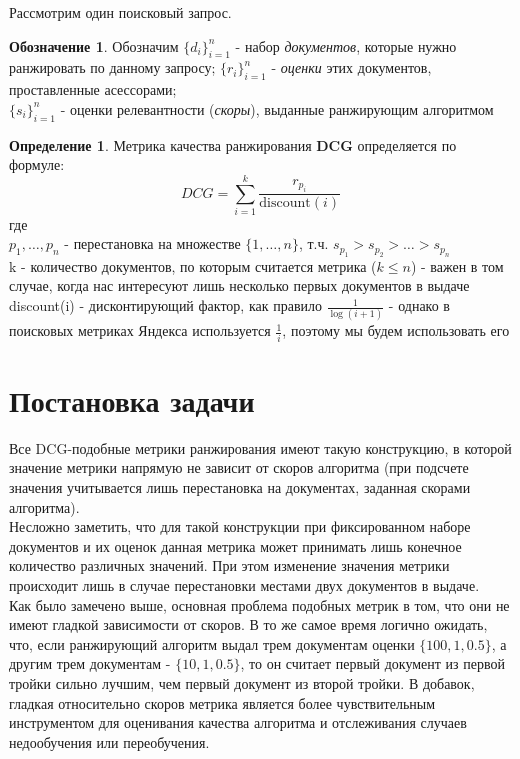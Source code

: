 \documentclass[14pt,a4paper]{amsart}
\theoremstyle{definition}
\newtheorem{definition}{Определение}[section]
\theoremstyle{definition}
\newtheorem{designation}{Обозначение}[section]
\newcommand{\Sum}{\sum\limits}
\renewcommand\i{\textit}
\renewcommand\t{\text}
\renewcommand\b{\textbf}
\begin{document}
Рассмотрим один поисковый запрос.

\begin{designation}
Обозначим $\{d_i\}_{i=1}^n$ - набор \i{документов}, которые нужно ранжировать по данному запросу; 
$\{r_i\}_{i=1}^n$ - \i{оценки} этих документов, проставленные асессорами; \\
$\{s_i\}_{i=1}^n$ - оценки релевантности (\i{скоры}), выданные ранжирующим алгоритмом
\end{designation}

\begin{definition}
Метрика качества ранжирования \b{DCG} определяется по формуле:
$$DCG = \Sum_{i=1}^k \frac{r_{p_i}}{\t{discount}(i)}$$
где \\
$p_1,\dots,p_n$ - перестановка на множестве $\{1,\dots,n\}$, т.ч. ${s_{p_1} > s_{p_2} > \dots > s_{p_n}}$ \\
k - количество документов, по которым считается метрика ($k \le n$) - важен в том случае, когда нас интересуют лишь несколько первых документов в выдаче \\
discount(i) - дисконтирующий фактор, как правило $\frac{1}{\log(i + 1)}$ - однако в поисковых метриках Яндекса используется $\frac{1}{i}$, поэтому мы будем использовать его \\
\end{definition}

\newpage
\section{Постановка задачи}

Все DCG-подобные метрики ранжирования имеют такую конструкцию, в которой значение метрики напрямую не зависит от скоров алгоритма (при подсчете значения учитывается лишь перестановка на документах, заданная скорами алгоритма).\\

Несложно заметить, что для такой конструкции при фиксированном наборе документов и их оценок данная метрика может принимать лишь конечное количество различных значений. При этом изменение значения метрики происходит лишь в случае перестановки местами двух документов в выдаче.\\

Как было замечено выше, основная проблема подобных метрик в том, что они не имеют гладкой зависимости от скоров. В то же самое время логично ожидать, что, если ранжирующий алгоритм выдал трем документам оценки $\{100, 1, 0.5\}$, а другим трем документам - $\{10, 1, 0.5\}$, то он считает первый документ из первой тройки сильно лучшим, чем первый документ из второй тройки. В добавок, гладкая относительно скоров метрика является более чувствительным инструментом для оценивания качества алгоритма и отслеживания случаев недообучения или переобучения.\\
\end{document}
